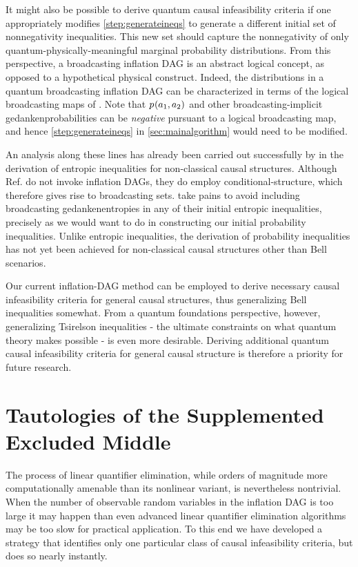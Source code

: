It might also be possible to derive quantum causal infeasibility criteria if one appropriately modifies \cref{step:generateineqs} to generate a different initial set of nonnegativity inequalities. This new set should capture the nonnegativity of only quantum-physically-meaningful marginal probability distributions. From this perspective, a broadcasting inflation DAG is an abstract logical concept, as opposed to a hypothetical physical construct. Indeed, the distributions in a quantum broadcasting inflation DAG can be characterized in terms of the logical broadcasting maps of \citet{Coecke2011}. Note that ${p_{}}\lparen a_1,a_2\rparen$ and other broadcasting-implicit gedankenprobabilities can be \emph{negative} pursuant to a logical broadcasting map, and hence \cref{step:generateineqs} in \cref{sec:mainalgorithm} would need to be modified.

An analysis along these lines has already been carried out successfully by \citet{Chaves2015infoquantum} in the derivation of entropic inequalities for non-classical causal structures. Although Ref. \citet{Chaves2015infoquantum} do not invoke inflation DAGs, they do employ conditional-structure, which therefore gives rise to broadcasting sets. \citet{Chaves2015infoquantum} take pains to avoid including broadcasting gedankenentropies in any of their initial entropic inequalities, precisely as we would want to do in constructing our initial probability inequalities. Unlike entropic inequalities, the derivation of probability inequalities has not yet been achieved for non-classical causal structures other than Bell scenarios. 

Our current inflation-DAG method can be employed to derive necessary causal infeasibility criteria for general causal structures, thus generalizing Bell inequalities somewhat. From a quantum foundations perspective, however, generalizing Tsirelson inequalities \cite{Tsirelson1980,Brunner2013Bell} - the ultimate constraints on what quantum theory makes possible - is even more desirable. Deriving additional quantum causal infeasibility criteria for general causal structure is therefore a priority for future research.


\section{Tautologies of the Supplemented Excluded Middle}\label{sec:TSEM}

The process of linear quantifier elimination, while orders of magnitude more computationally amenable than its nonlinear variant, is nevertheless nontrivial. When the number of observable random variables in the inflation DAG is too large it may happen than even advanced linear quantifier elimination algorithms may be too slow for practical application. To this end we have developed a strategy that identifies only one particular class of causal infeasibility criteria, but does so nearly instantly.

